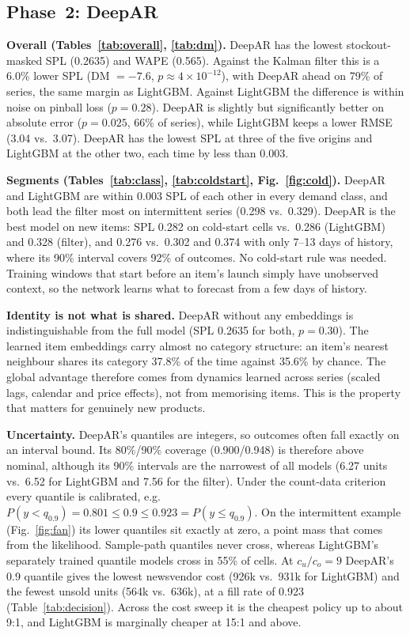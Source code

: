 \documentclass[conference]{IEEEtran}
\begin{document}
\subsection{Phase~2: DeepAR}
\textbf{Overall (Tables~\ref{tab:overall}, \ref{tab:dm}).} DeepAR has the lowest stockout-masked SPL (0.2635) and WAPE (0.565). Against the Kalman filter this is a 6.0\% lower SPL (DM $=-7.6$, $p\approx4\times10^{-12}$), with DeepAR ahead on 79\% of series, the same margin as LightGBM. Against LightGBM the difference is within noise on pinball loss ($p=0.28$). DeepAR is slightly but significantly better on absolute error ($p=0.025$, 66\% of series), while LightGBM keeps a lower RMSE (3.04 vs.\ 3.07). DeepAR has the lowest SPL at three of the five origins and LightGBM at the other two, each time by less than 0.003.

\textbf{Segments (Tables~\ref{tab:class}, \ref{tab:coldstart}, Fig.~\ref{fig:cold}).} DeepAR and LightGBM are within 0.003 SPL of each other in every demand class, and both lead the filter most on intermittent series (0.298 vs.\ 0.329). DeepAR is the best model on new items: SPL 0.282 on cold-start cells vs.\ 0.286 (LightGBM) and 0.328 (filter), and 0.276 vs.\ 0.302 and 0.374 with only 7--13 days of history, where its 90\% interval covers 92\% of outcomes. No cold-start rule was needed. Training windows that start before an item's launch simply have unobserved context, so the network learns what to forecast from a few days of history.

\textbf{Identity is not what is shared.} DeepAR without any embeddings is indistinguishable from the full model (SPL 0.2635 for both, $p=0.30$). The learned item embeddings carry almost no category structure: an item's nearest neighbour shares its category 37.8\% of the time against 35.6\% by chance. The global advantage therefore comes from dynamics learned across series (scaled lags, calendar and price effects), not from memorising items. This is the property that matters for genuinely new products.

\textbf{Uncertainty.} DeepAR's quantiles are integers, so outcomes often fall exactly on an interval bound. Its 80\%/90\% coverage (0.900/0.948) is therefore above nominal, although its 90\% intervals are the narrowest of all models (6.27 units vs.\ 6.52 for LightGBM and 7.56 for the filter). Under the count-data criterion every quantile is calibrated, e.g.\ $P(y<q_{0.9})=0.801\le0.9\le0.923=P(y\le q_{0.9})$. On the intermittent example (Fig.~\ref{fig:fan}) its lower quantiles sit exactly at zero, a point mass that comes from the likelihood. Sample-path quantiles never cross, whereas LightGBM's separately trained quantile models cross in 55\% of cells. At $c_u/c_o=9$ DeepAR's 0.9 quantile gives the lowest newsvendor cost (926k vs.\ 931k for LightGBM) and the fewest unsold units (564k vs.\ 636k), at a fill rate of 0.923 (Table~\ref{tab:decision}). Across the cost sweep it is the cheapest policy up to about 9:1, and LightGBM is marginally cheaper at 15:1 and above.
\end{document}
